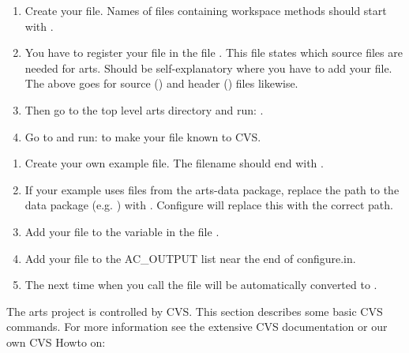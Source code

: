\begin{enumerate}
\item Create your file. Names of files containing workspace methods should
  start with .
\item You have to register your file in the file .
  This file states which source files are needed for arts. Should be
  self-explanatory where you have to add your file. The above goes for
  source () and header () files likewise.
\item Then go to the top level arts directory and run: .
\item Go to  and run:  to make your
  file known to CVS.
\end{enumerate}


\begin{enumerate}
\item Create your own example file. The filename should end with
  .
\item If your example uses files from the arts-data package, replace
  the path to the data package (e.g. )
  with . Configure will replace this with the
  correct path.
\item Add your file to the variable  in the file\newline
  .
\item Add your file to the AC\_OUTPUT list near the end of configure.in.
\item The next time when you call  the  file will
  be automatically converted to .
\end{enumerate}


 \label{sec:development:cvs}

The arts project is controlled by CVS. This section describes some
basic CVS commands. For more information see the extensive CVS
documentation or our own CVS Howto on:
\begin{quote}
\end{quote}




